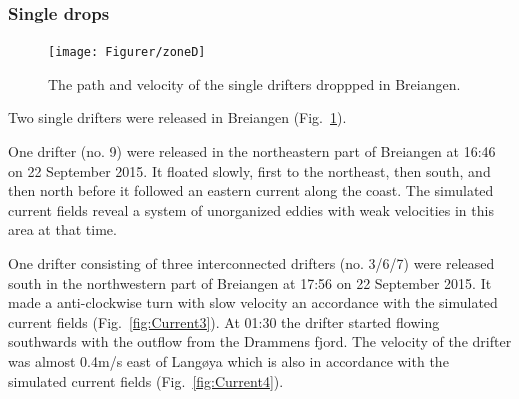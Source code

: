 \documentclass[12pt,a4paper,english]{article}
\begin{document}
\subsubsection{Single drops}
%
\begin{figure}[ht]
\centerline{
\texttt{[image: Figurer/zoneD]}}
\caption{\small
The path and velocity of the single drifters droppped in Breiangen.}
\label{fig:ZoneD}
\end{figure}
%
%
Two single drifters were released in Breiangen (Fig.~\ref{fig:ZoneD}).

One drifter (no. 9) were released in the northeastern part of Breiangen at 16:46 on 22 September 2015. It floated slowly, first to the northeast, then south, and then north before it followed an eastern current along the coast. The simulated current fields reveal a system of unorganized eddies with weak velocities in this area at that time.

One drifter consisting of three interconnected drifters (no. 3/6/7) were released south in the northwestern part of Breiangen at 17:56 on 22 September 2015. It made a anti-clockwise turn with slow velocity an accordance with the simulated current fields (Fig.~\ref{fig:Current3}). At 01:30 the drifter started flowing southwards with the outflow from the Drammens fjord. The velocity of the drifter was almost 0.4m/s east of Lang\o ya which is also in accordance with the simulated current fields (Fig.~\ref{fig:Current4}).   


%
%
%
\end{document}
